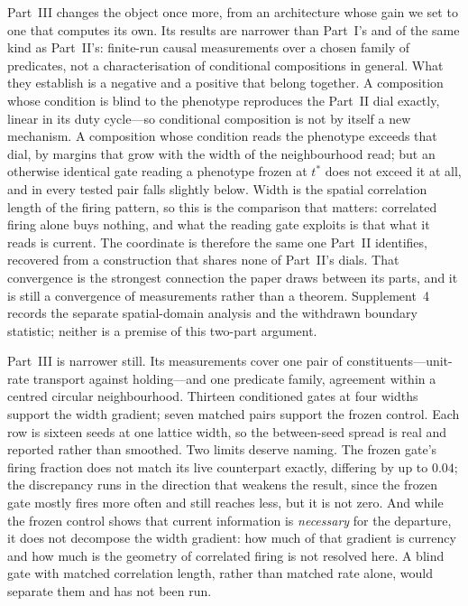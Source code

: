 \documentclass[man,12pt,floatsintext,donotrepeattitle]{apa7}
\begin{document}
Part~III changes the object once more, from an architecture whose gain we set to
one that computes its own. Its results are narrower than Part~I's and of the same
kind as Part~II's: finite-run causal measurements over a chosen family of
predicates, not a characterisation of conditional compositions in general. What
they establish is a negative and a positive that belong together. A composition
whose condition is blind to the phenotype reproduces the Part~II dial exactly,
linear in its duty cycle---so conditional composition is not by itself a new
mechanism. A composition whose condition reads the phenotype exceeds that dial,
by margins that grow with the width of the neighbourhood read; but an otherwise
identical gate reading a phenotype frozen at $t^{*}$ does not exceed it at all,
and in every tested pair falls slightly below. Width is the spatial correlation
length of the firing pattern, so this is the comparison that matters: correlated
firing alone buys nothing, and what the reading gate exploits is that what it
reads is current. The coordinate is therefore the same one Part~II identifies,
recovered from a construction that shares none of Part~II's dials. That
convergence is the strongest connection the paper draws between its parts, and it
is still a convergence of measurements rather than a theorem. Supplement~4 records the separate spatial-domain
analysis and the withdrawn boundary statistic; neither is a premise of this
two-part argument.

Part~III is narrower still. Its measurements cover one pair of constituents---unit-rate
transport against holding---and one predicate family, agreement within a centred
circular neighbourhood. Thirteen conditioned gates at four widths support the width
gradient; seven matched pairs support the frozen control. Each row is sixteen seeds at
one lattice width, so the between-seed spread is real and reported rather than
smoothed. Two limits deserve naming. The frozen gate's firing fraction does not match
its live counterpart exactly, differing by up to $0.04$; the discrepancy runs in the
direction that weakens the result, since the frozen gate mostly fires more often and
still reaches less, but it is not zero. And while the frozen control shows that current
information is \emph{necessary} for the departure, it does not decompose the width
gradient: how much of that gradient is currency and how much is the geometry of
correlated firing is not resolved here. A blind gate with matched correlation length,
rather than matched rate alone, would separate them and has not been run.
\end{document}
